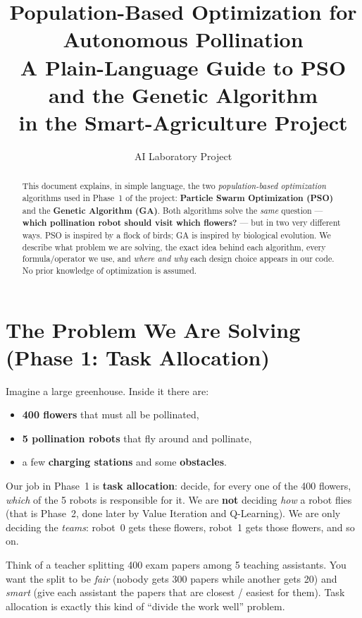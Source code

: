 \documentclass[11pt]{article}
\title{\textbf{Population-Based Optimization for Autonomous Pollination}\\[4pt]
\large A Plain-Language Guide to PSO and the Genetic Algorithm\\ in the
Smart-Agriculture Project}
\author{AI Laboratory Project}
\date{}
\begin{document}
\maketitle

\begin{abstract}
\noindent
This document explains, in simple language, the two \emph{population-based
optimization} algorithms used in Phase~1 of the project: \textbf{Particle Swarm
Optimization (PSO)} and the \textbf{Genetic Algorithm (GA)}. Both algorithms
solve the \emph{same} question --- \textbf{which pollination robot should visit
which flowers?} --- but in two very different ways. PSO is inspired by a flock of
birds; GA is inspired by biological evolution. We describe what problem we are
solving, the exact idea behind each algorithm, every formula/operator we use, and
\emph{where and why} each design choice appears in our code. No prior knowledge
of optimization is assumed.
\end{abstract}

\tableofcontents

\section{The Problem We Are Solving (Phase 1: Task Allocation)}

Imagine a large greenhouse. Inside it there are:
\begin{itemize}[nosep]
  \item \textbf{400 flowers} that must all be pollinated,
  \item \textbf{5 pollination robots} that fly around and pollinate,
  \item a few \textbf{charging stations} and some \textbf{obstacles}.
\end{itemize}

Our job in Phase~1 is \textbf{task allocation}: decide, for every one of the
400 flowers, \emph{which} of the 5 robots is responsible for it. We are
\textbf{not} deciding \emph{how} a robot flies (that is Phase~2, done later by
Value Iteration and Q-Learning). We are only deciding the \emph{teams}: robot~0
gets these flowers, robot~1 gets those flowers, and so on.

\begin{intuition}
Think of a teacher splitting 400 exam papers among 5 teaching assistants. You
want the split to be \emph{fair} (nobody gets 300 papers while another gets 20)
and \emph{smart} (give each assistant the papers that are closest / easiest for
them). Task allocation is exactly this kind of ``divide the work well'' problem.
\end{intuition}
\end{document}

